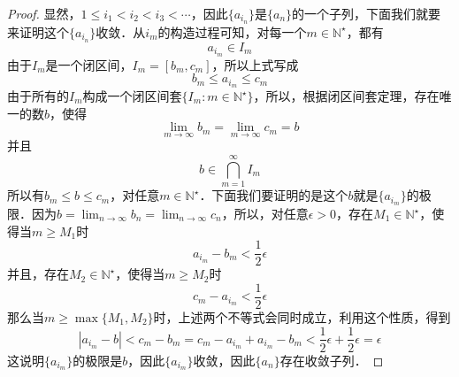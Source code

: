 \documentclass{ctexart}
\theoremstyle{definition}
\theoremstyle{definition}
\theoremstyle{plain}
\theoremstyle{plain}
\theoremstyle{plain}
\theoremstyle{definition}
\newcommand{\nat}{\mathbb{N}^\star}
\begin{document}
\begin{proof}
\noindent 显然，$1 \leq i_1 < i_2 < i_3 < \cdots$，因此$\{a_{i_n}\}$是$\{a_n\}$的一个子列，下面我们就要来证明这个$\{a_{i_n}\}$收敛．从$i_m$的构造过程可知，对每一个$m \in \nat$，都有
\begin{equation}
    a_{i_m} \in I_m
\end{equation}
由于$I_m$是一个闭区间，$I_m = [b_m, c_m]$，所以上式写成
\begin{equation}
    b_m \leq a_{i_m} \leq c_m
\end{equation}
由于所有的$I_m$构成一个闭区间套$\{ I_m: m \in \nat \}$，所以，根据闭区间套定理，存在唯一的数$b$，使得
\begin{equation}
    \lim_{m\to\infty} b_m = \lim_{m\to\infty} c_m = b
\end{equation}
并且
\begin{equation}
    b \in \bigcap_{m=1}^\infty I_m
\end{equation}
所以有$b_m \leq b \leq c_m$，对任意$m \in \nat$．下面我们要证明的是这个$b$就是$\{a_{i_m}\}$的极限．因为$b = \displaystyle\lim_{n\to\infty}b_n=\lim_{n\to\infty}c_n$，所以，对任意$\epsilon > 0$，存在$M_1 \in \nat$，使得当$m \geq M_1$时
\begin{equation}
    a_{i_m} - b_m < \frac{1}{2}\epsilon
\end{equation}
并且，存在$M_2 \in \nat$，使得当$m \geq M_2$时
\begin{equation}
    c_m - a_{i_m} < \frac{1}{2}\epsilon
\end{equation}
那么当$m \geq \max \{ M_1, M_2 \}$时，上述两个不等式会同时成立，利用这个性质，得到
\begin{equation}
    |a_{i_m} - b| < c_m - b_m = c_m - a_{i_m} + a_{i_m} - b_m < \frac{1}{2}\epsilon+\frac{1}{2}\epsilon = \epsilon
\end{equation}
这说明$\{a_{i_m}\}$的极限是$b$，因此$\{a_{i_m}\}$收敛，因此$\{a_n\}$存在收敛子列．
\end{proof}
\end{document}
